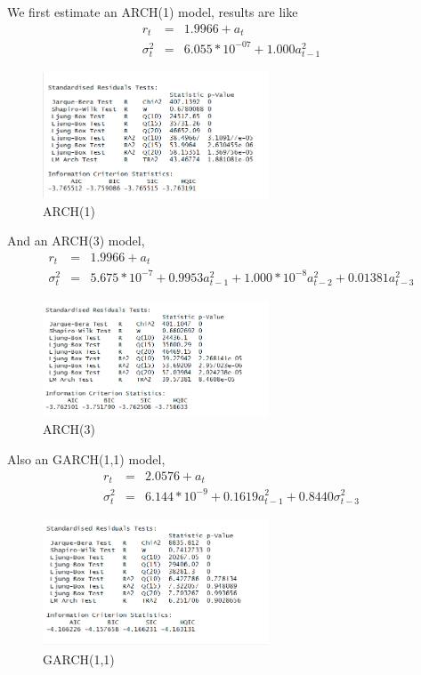 \documentclass[12pt, a4paper, titlepage]{article}
\begin{document}
We first estimate an ARCH(1) model, results are like
\begin{eqnarray*}
r_t &=& 1.9966 + a_t\\
\sigma_t^2 &=& 6.055*10^{-07} + 1.000 a_{t-1}^2 
\end{eqnarray*}
\begin{figure}[h!]
\begin{center}
\caption{ARCH(1)}\label{ARCH(1)}
\includegraphics[width=0.6\textwidth]{arch1a.png} 
\end{center}
\end{figure}

And an ARCH(3) model,
\begin{eqnarray*}
r_t &=& 1.9966 + a_t\\
\sigma_t^2 &=& 5.675*10^{-7} + 0.9953 a_{t-1}^2 + 1.000*10^{-8} a_{t-2}^2 +0.01381 a_{t-3}^2
\end{eqnarray*}
\begin{figure}[h!]
\begin{center}
\caption{ARCH(3)}\label{ARCH(3)}
\includegraphics[width=0.6\textwidth]{arch3a.png} 
\end{center}
\end{figure}

Also an GARCH(1,1) model,
\begin{eqnarray*}
r_t &=& 2.0576 + a_t\\
\sigma_t^2 &=& 6.144*10^{-9} + 0.1619 a_{t-1}^2 + 0.8440 \sigma_{t-3}^2
\end{eqnarray*}
\begin{figure}[h!]
\begin{center}
\caption{GARCH(1,1)}\label{GARCH(1,1)}
\includegraphics[width=0.6\textwidth]{garch11a.png} 
\end{center}
\end{figure}
\end{document}
